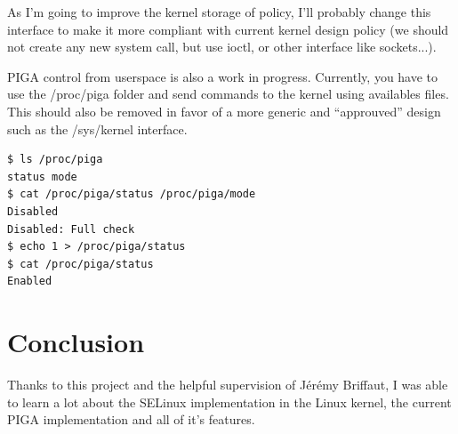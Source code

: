 \documentclass[pdftex,a4paper,titlepage,11pt]{article}
\begin{document}
As I'm going to improve the kernel storage of policy, I'll probably change this interface to make it more compliant with current kernel design policy (we should not create any new system call, but use ioctl, or other interface like sockets...).

PIGA control from userspace is also a work in progress. Currently, you have to use the /proc/piga folder and send commands to the kernel using availables files. This should also be removed in favor of a more generic and ``approuved'' design such as the /sys/kernel interface.

\begin{lstlisting}
$ ls /proc/piga
status mode
$ cat /proc/piga/status /proc/piga/mode
Disabled
Disabled: Full check
$ echo 1 > /proc/piga/status
$ cat /proc/piga/status
Enabled
\end{lstlisting}

\newpage

\section*{Conclusion} 

Thanks to this project and the helpful supervision of Jérémy Briffaut, I was able to learn a lot about the SELinux implementation in the Linux kernel, the current PIGA implementation and all of it's features.


%
%
%
%
%
%

\newpage
\end{document}
